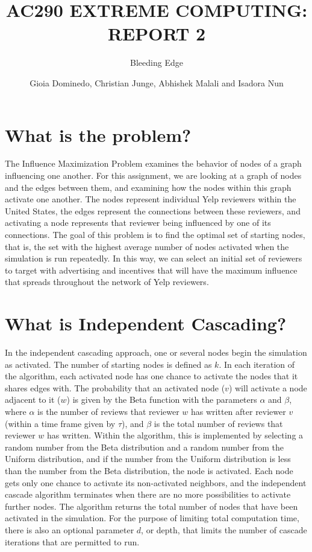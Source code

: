 \documentclass[11pt]{scrartcl} %
\title{AC290 EXTREME COMPUTING: REPORT 2}
\subtitle{Bleeding Edge}
\author{Gioia Dominedo, Christian Junge, Abhishek Malali and Isadora Nun}
\begin{document}
\maketitle

\section{What is the problem?}

\setlength{\parindent}{10ex}

The Influence Maximization Problem examines the behavior of nodes of a graph influencing one another.  For this assignment, we are looking at a graph of nodes and the edges between them, and examining how the nodes within this graph activate one another.  The nodes represent individual Yelp reviewers within the United States, the edges represent the connections between these reviewers, and activating a node represents that reviewer being influenced by one of its connections.  The goal of this problem is to find the optimal set of starting nodes, that is, the set with the highest average number of nodes activated when the simulation is run repeatedly.  In this way, we can select an initial set of reviewers to target with advertising and incentives that will have the maximum influence that spreads throughout the network of Yelp reviewers.  


\section{What is Independent Cascading?}

In the independent cascading approach, one or several nodes begin the simulation as activated.  The number of starting nodes is defined as $k$. In each iteration of the algorithm, each activated node has one chance to activate the nodes that it shares edges with.  The probability that an activated node ($v$) will activate a node adjacent to it ($w$) is given by the Beta function with the parameters $\alpha$ and $\beta$, where $\alpha$ is the number of reviews that reviewer $w$ has written after reviewer $v$ (within a time frame given by $\tau$), and $\beta$ is the total number of reviews that reviewer $w$ has written.  Within the algorithm, this is implemented by selecting a random number from the Beta distribution and a random number from the Uniform distribution, and if the number from the Uniform distribution is less than the number from the Beta distribution, the node is activated.  Each node gets only one chance to activate its non-activated neighbors, and the independent cascade algorithm terminates when there are no more possibilities to activate further nodes.  The algorithm returns the total number of nodes that have been activated in the simulation.  For the purpose of limiting total computation time, there is also an optional parameter $d$, or depth, that limits the number of cascade iterations that are permitted to run.  
\end{document}
